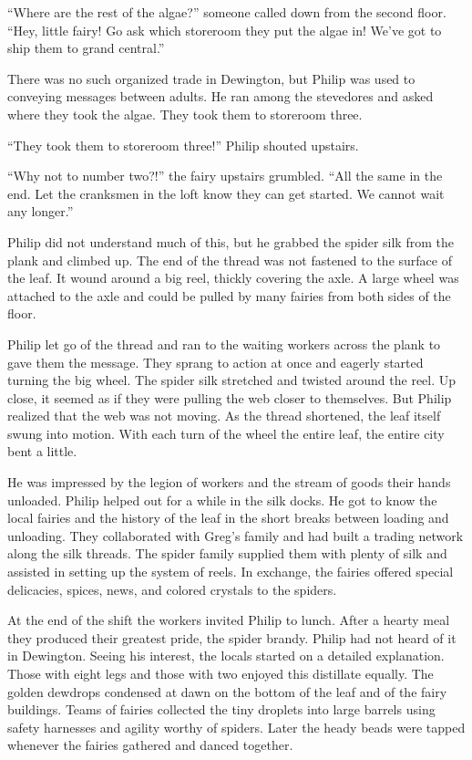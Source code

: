 \documentclass[10pt, draft]{memoir}
\begin{document}
``Where are the rest of the algae?'' someone called down from the second floor. ``Hey, little fairy! Go ask which storeroom they put the algae in! We've got to ship them to grand central.''

There was no such organized trade in Dewington, but Philip was used to conveying messages between adults. He ran among the stevedores and asked where they took the algae. They took them to storeroom three.

``They took them to storeroom three!'' Philip shouted upstairs.

``Why not to number two?!'' the fairy upstairs grumbled. ``All the same in the end. Let the cranksmen in the loft know they can get started. We cannot wait any longer.''

Philip did not understand much of this, but he grabbed the spider silk from the plank and climbed up. The end of the thread was not fastened to the surface of the leaf. It wound around a big reel, thickly covering the axle. A large wheel was attached to the axle and could be pulled by many fairies from both sides of the floor.

Philip let go of the thread and ran to the waiting workers across the plank to gave them the message. They sprang to action at once and eagerly started turning the big wheel. The spider silk stretched and twisted around the reel. Up close, it seemed as if they were pulling the web closer to themselves. But Philip realized that the web was not moving. As the thread shortened, the leaf itself swung into motion. With each turn of the wheel the entire leaf, the entire city bent a little.

He was impressed by the legion of workers and the stream of goods their hands unloaded. Philip helped out for a while in the silk docks. He got to know the local fairies and the history of the leaf in the short breaks between loading and unloading. They collaborated with Greg's family and had built a trading network along the silk threads. The spider family supplied them with plenty of silk and assisted in setting up the system of reels. In exchange, the fairies offered special delicacies, spices, news, and colored crystals to the spiders.

At the end of the shift the workers invited Philip to lunch. After a hearty meal they produced their greatest pride, the spider brandy. Philip had not heard of it in Dewington. Seeing his interest, the locals started on a detailed explanation. Those with eight legs and those with two enjoyed this distillate equally. The golden dewdrops condensed at dawn on the bottom of the leaf and of the fairy buildings. Teams of fairies collected the tiny droplets into large barrels using safety harnesses and agility worthy of spiders. Later the heady beads were tapped whenever the fairies gathered and danced together.
\end{document}
